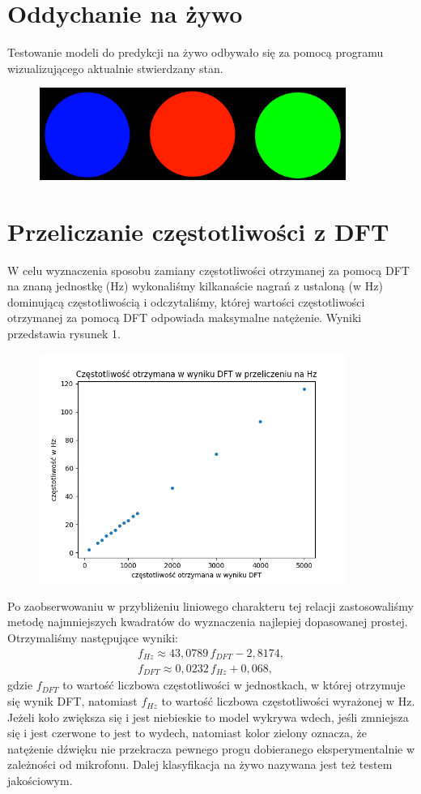 \documentclass[polish]{article}
\begin{document}
\section{Oddychanie na żywo}
Testowanie modeli do predykcji na żywo odbywało się za pomocą programu wizualizującego aktualnie
stwierdzany stan. 
\begin{figure}[H]
	\centering
	\includegraphics[width=10cm]{wdechwydechcisza}
\end{figure}
\section{Przeliczanie częstotliwości z DFT}
W celu wyznaczenia sposobu zamiany częstotliwości otrzymanej za pomocą DFT na znaną jednostkę (Hz) wykonaliśmy kilkanaście nagrań z ustaloną (w Hz) dominującą częstotliwością i odczytaliśmy, której wartości częstotliwości otrzymanej za pomocą DFT odpowiada maksymalne natężenie. Wyniki przedstawia rysunek 1.
\begin{figure}[H]
	\centering
	\includegraphics[width=10cm]{przeliczanie_dft_hz}
	\caption{}
\end{figure}
\noindent Po zaobserwowaniu w przybliżeniu liniowego charakteru tej relacji zastosowaliśmy metodę najmniejszych kwadratów do wyznaczenia najlepiej dopasowanej prostej. Otrzymaliśmy następujące wyniki:
\begin{gather*}
	f_{\unit{Hz}}\approx43,0789\,f_{\unit{DFT}}-2,8174,\\
	f_{\unit{DFT}}\approx0,0232\,f_{\unit{Hz}}+0,068,
\end{gather*}
gdzie $f_{\unit{DFT}}$ to wartość liczbowa częstotliwości w jednostkach, w której otrzymuje się wynik DFT, natomiast $f_{\unit{Hz}}$ to wartość liczbowa częstotliwości wyrażonej w \unit{Hz}.
Jeżeli koło zwiększa się i jest niebieskie to model wykrywa wdech, jeśli zmniejsza się i jest
czerwone to jest to wydech, natomiast kolor zielony oznacza, że natężenie dźwięku nie przekracza pewnego 
progu dobieranego eksperymentalnie w zależności od mikrofonu.
Dalej klasyfikacja na żywo nazywana jest też testem jakościowym.
\end{document}
